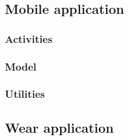 \subsection{Mobile application}
\label{subsec:MobileApplication}

\subsubsection{Activities}
\label{subsec:Activities}

\subsubsection{Model}
\label{subsec:Model}

\subsubsection{Utilities}
\label{subsec:Utilities}

\subsection{Wear application}
\label{subsec:WearApplication}